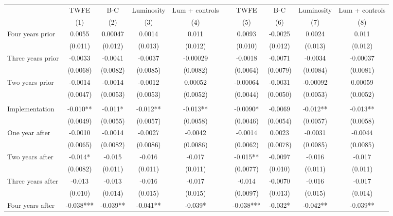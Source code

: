 \begin{tabular}{lccccccccc}
\toprule
      & TWFE  & B-C   & Luminosity & Lum + controls &       & TWFE  & B-C   & Luminosity & Lum + controls \\
\cmidrule{2-5}\cmidrule{7-10}      & (1)   & (2)   & (3)   & (4)   &       & (5)   & (6)   & (7)   & (8) \\
\midrule
\midrule
Four years prior & 0.0055 & 0.00047 & 0.0014 & 0.011 &       & 0.0093 & -0.0025 & 0.0024 & 0.011 \\
      & (0.011) & (0.012) & (0.013) & (0.012) &       & (0.010) & (0.012) & (0.013) & (0.012) \\
Three years prior & -0.0033 & -0.0041 & -0.0037 & -0.00029 &       & -0.0018 & -0.0071 & -0.0034 & -0.00037 \\
      & (0.0068) & (0.0082) & (0.0085) & (0.0082) &       & (0.0064) & (0.0079) & (0.0084) & (0.0081) \\
Two years prior & -0.0014 & -0.0014 & -0.0012 & 0.00052 &       & -0.00064 & -0.0031 & -0.00092 & 0.00059 \\
      & (0.0047) & (0.0053) & (0.0053) & (0.0052) &       & (0.0044) & (0.0050) & (0.0053) & (0.0052) \\
      &       &       &       &       &       &       &       &       &  \\
Implementation & -0.010** & -0.011* & -0.012** & -0.013** &       & -0.0090* & -0.0069 & -0.012** & -0.013** \\
      & (0.0049) & (0.0055) & (0.0057) & (0.0058) &       & (0.0046) & (0.0054) & (0.0057) & (0.0058) \\
One year after & -0.0010 & -0.0014 & -0.0027 & -0.0042 &       & -0.0014 & 0.0023 & -0.0031 & -0.0044 \\
      & (0.0065) & (0.0082) & (0.0086) & (0.0086) &       & (0.0062) & (0.0078) & (0.0085) & (0.0085) \\
Two years after & -0.014* & -0.015 & -0.016 & -0.017 &       & -0.015** & -0.0097 & -0.016 & -0.017 \\
      & (0.0082) & (0.011) & (0.011) & (0.011) &       & (0.0077) & (0.010) & (0.011) & (0.011) \\
Three years after & -0.013 & -0.013 & -0.016 & -0.017 &       & -0.014 & -0.0070 & -0.016 & -0.017 \\
      & (0.010) & (0.014) & (0.015) & (0.015) &       & (0.0097) & (0.013) & (0.015) & (0.014) \\
Four years after & -0.038*** & -0.039** & -0.041** & -0.039* &       & -0.038*** & -0.032* & -0.042** & -0.039** \\

\end{tabular}
